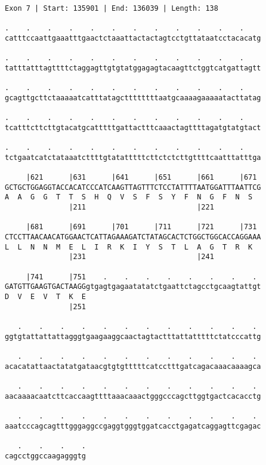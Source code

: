 \documentclass{article}
\begin{document}
\newpage
\begin{Verbatim}[fontfamily=courier]
Exon 7 | Start: 135901 | End: 136039 | Length: 138

.    .    .    .    .    .    .    .    .    .    .    .    
catttccaattgaaatttgaactctaaattactactagtcctgttataatcctacacatg

.    .    .    .    .    .    .    .    .    .    .    .    
tatttatttagttttctaggagttgtgtatggagagtacaagttctggtcatgattagtt

.    .    .    .    .    .    .    .    .    .    .    .    
gcagttgcttctaaaaatcatttatagcttttttttaatgcaaaagaaaaatacttatag

.    .    .    .    .    .    .    .    .    .    .    .    
tcatttcttcttgtacatgcatttttgattactttcaaactagttttagatgtatgtact

.    .    .    .    .    .    .    .    .    .    .    .    
tctgaatcatctataaatcttttgtatatttttcttctctcttgttttcaatttatttga

     |621      |631      |641      |651      |661      |671 
GCTGCTGGAGGTACCACATCCCATCAAGTTAGTTTCTCCTATTTTAATGGATTTAATTCG
A  A  G  G  T  T  S  H  Q  V  S  F  S  Y  F  N  G  F  N  S  
               |211                          |221           

     |681      |691      |701      |711      |721      |731 
CTCCTTAACAACATGGAACTCATTAGAAAGATCTATAGCACTCTGGCTGGCACCAGGAAA
L  L  N  N  M  E  L  I  R  K  I  Y  S  T  L  A  G  T  R  K  
               |231                          |241           

     |741      |751    .    .    .    .    .    .    .    . 
GATGTTGAAGTGACTAAGGgtgagtgagaatatatctgaattctagcctgcaagtattgt
D  V  E  V  T  K  E                                         
               |251                                         

   .    .    .    .    .    .    .    .    .    .    .    . 
ggtgtattattattagggtgaagaaggcaactagtactttattatttttctatcccattg

   .    .    .    .    .    .    .    .    .    .    .    . 
acacatattaactatatgataacgtgtgtttttcatcctttgatcagacaaacaaaagca

   .    .    .    .    .    .    .    .    .    .    .    . 
aacaaaacaatcttcaccaagttttaaacaaactgggcccagcttggtgactcacacctg

   .    .    .    .    .    .    .    .    .    .    .    . 
aaatcccagcagtttgggaggccgaggtgggtggatcacctgagatcaggagttcgagac

   .    .    .    .
cagcctggccaagagggtg
\end{Verbatim}
\newpage
\end{document}
